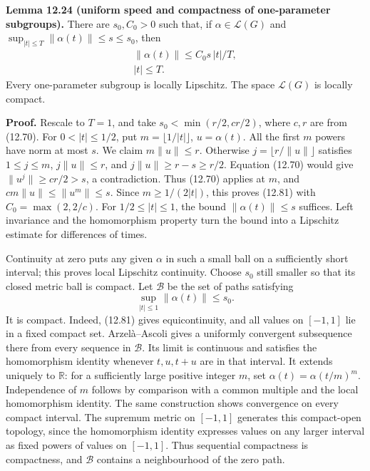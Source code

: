 \documentclass[
  11pt,
]{article}
\begin{document}
\textbf{Lemma 12.24 (uniform speed and compactness of one-parameter
subgroups).} There are \(s_0,C_0>0\) such that, if
\(\alpha\in\mathcal L(G)\) and
\(\sup_{|t|\leq T}\|\alpha(t)\|\leq s\leq s_0\), then \[
\begin{gathered}
\|\alpha(t)\|\leq C_0s\,|t|/T,\\
|t|\leq T.
\end{gathered}
\tag{12.81}
\] Every one-parameter subgroup is locally Lipschitz. The space
\(\mathcal L(G)\) is locally compact.

\textbf{Proof.} Rescale to \(T=1\), and take \(s_0<\min(r/2,cr/2)\),
where \(c,r\) are from (12.70). For \(0<|t|\leq1/2\), put
\(m=\lfloor1/|t|\rfloor\), \(u=\alpha(t)\). All the first \(m\) powers
have norm at most \(s\). We claim \(m\|u\|\leq r\). Otherwise
\(j=\lfloor r/\|u\|\rfloor\) satisfies \(1\leq j\leq m\),
\(j\|u\|\leq r\), and \(j\|u\|\geq r-s\geq r/2\). Equation (12.70) would
give \(\|u^j\|\geq cr/2>s\), a contradiction. Thus (12.70) applies at
\(m\), and \(cm\|u\|\leq\|u^m\|\leq s\). Since \(m\geq1/(2|t|)\), this
proves (12.81) with \(C_0=\max(2,2/c)\). For \(1/2\leq|t|\leq1\), the
bound \(\|\alpha(t)\|\leq s\) suffices. Left invariance and the
homomorphism property turn the bound into a Lipschitz estimate for
differences of times.

Continuity at zero puts any given \(\alpha\) in such a small ball on a
sufficiently short interval; this proves local Lipschitz continuity.
Choose \(s_0\) still smaller so that its closed metric ball is compact.
Let \(\mathcal B\) be the set of paths satisfying \[
\sup_{|t|\leq1}\|\alpha(t)\|\leq s_0.
\tag{12.82}
\] It is compact. Indeed, (12.81) gives equicontinuity, and all values
on \([-1,1]\) lie in a fixed compact set. Arzelà--Ascoli gives a
uniformly convergent subsequence there from every sequence in
\(\mathcal B\). Its limit is continuous and satisfies the homomorphism
identity whenever \(t,u,t+u\) are in that interval. It extends uniquely
to \(\mathbb R\): for a sufficiently large positive integer \(m\), set
\(\alpha(t)=\alpha(t/m)^m\). Independence of \(m\) follows by comparison
with a common multiple and the local homomorphism identity. The same
construction shows convergence on every compact interval. The supremum
metric on \([-1,1]\) generates this compact-open topology, since the
homomorphism identity expresses values on any larger interval as fixed
powers of values on \([-1,1]\). Thus sequential compactness is
compactness, and \(\mathcal B\) contains a neighbourhood of the zero
path.
\end{document}
